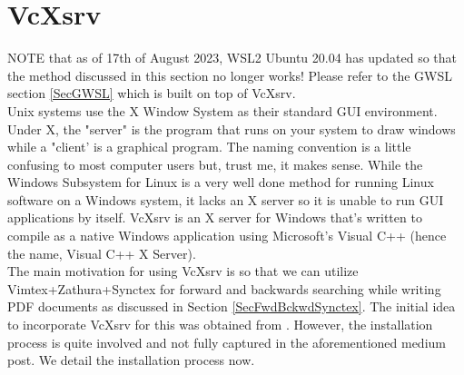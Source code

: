 \section{VcXsrv} \label{SecVcXsrv}
NOTE that as of 17th of August 2023, WSL2 Ubuntu 20.04 has updated so that the method
discussed in this section no longer works! Please refer to the GWSL section
\ref{SecGWSL} which is built on top of VcXsrv.\\

Unix systems use the X Window System as their standard GUI environment.  Under
X, the "server" is the program that runs on your system to draw windows while a
"client' is a graphical program. The naming convention is a little confusing to
most computer users but, trust me, it makes sense.  While the Windows Subsystem
for Linux is a very well done method for running Linux software on a Windows
system, it lacks an X server so it is unable to run GUI applications by itself.
VcXsrv is an X server for Windows that's written to compile as a native Windows
application using Microsoft's Visual C++ (hence the name, Visual C++ X
Server).\\

The main motivation for using VcXsrv is so that we can utilize
Vimtex+Zathura+Synctex for forward and backwards searching while writing PDF
documents as discussed in Section \ref{SecFwdBckwdSynctex}. The initial idea to
incorporate VcXsrv for this was obtained from \cite{jong2020blazing}. However,
the installation process is quite involved and not fully captured in the
aforementioned medium post. We detail the installation process now.

